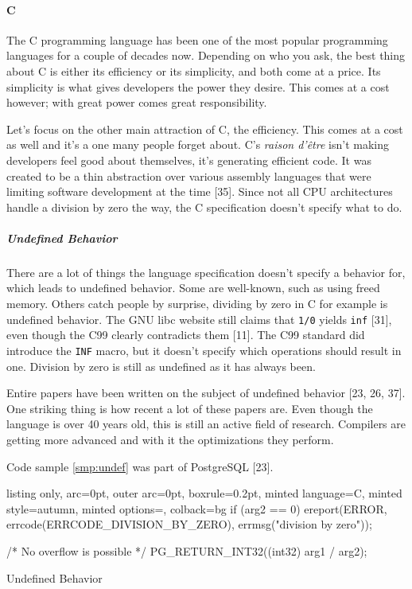 \documentclass[]{article}
\let\oldparagraph\paragraph
\renewcommand{\paragraph}[1]{\oldparagraph{#1}\mbox{}}
\let\oldsubparagraph\subparagraph
\renewcommand{\subparagraph}[1]{\oldsubparagraph{#1}\mbox{}}
\begin{document}
\paragraph{C}\label{c}

The C programming language has been one of the most popular programming
languages for a couple of decades now. Depending on who you ask, the
best thing about C is either its efficiency or its simplicity, and both
come at a price. Its simplicity is what gives developers the power they
desire. This comes at a cost however; with great power comes great
responsibility.

Let's focus on the other main attraction of C, the efficiency. This
comes at a cost as well and it's a one many people forget about. C's
\emph{raison d'être} isn't making developers feel good about themselves,
it's generating efficient code. It was created to be a thin abstraction
over various assembly languages that were limiting software development
at the time {[}35{]}. Since not all CPU architectures handle a division
by zero the way, the C specification doesn't specify what to do.

\subparagraph{Undefined Behavior}\label{undefined-behavior}

There are a lot of things the language specification doesn't specify a
behavior for, which leads to undefined behavior. Some are well-known,
such as using freed memory. Others catch people by surprise, dividing by
zero in C for example is undefined behavior. The GNU libc website still
claims that \texttt{1/0} yields \texttt{inf} {[}31{]}, even though the
C99 clearly contradicts them {[}11{]}. The C99 standard did introduce
the \texttt{INF} macro, but it doesn't specify which operations should
result in one. Division by zero is still as undefined as it has always
been.

Entire papers have been written on the subject of undefined behavior
{[}23, 26, 37{]}. One striking thing is how recent a lot of these papers
are. Even though the language is over 40 years old, this is still an
active field of research. Compilers are getting more advanced and with
it the optimizations they perform.

Code sample \ref{smp:undef} was part of PostgreSQL {[}23{]}.

\begin{code}
  \begin{tcblisting}{listing only, 
  arc=0pt,
  outer arc=0pt, 
  boxrule=0.2pt,
  minted language=C,
  minted style=autumn,
  minted options={},
  colback=bg }
if (arg2 == 0)
  ereport(ERROR, 
    errcode(ERRCODE_DIVISION_BY_ZERO),
    errmsg("division by zero"));
                    
/* No overflow is possible */
PG_RETURN_INT32((int32) arg1 / arg2);
\end{tcblisting}
\caption{Undefined Behavior}\label{smp:undef}
\end{code}
\end{document}
